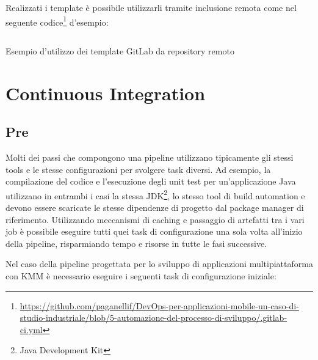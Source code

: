 Realizzati i template è possibile utilizzarli tramite inclusione remota come nel seguente codice\footnote{\href{https://github.com/paganellif/DevOps-per-applicazioni-mobile-un-caso-di-studio-industriale/blob/5-automazione-del-processo-di-sviluppo/.gitlab-ci.yml}{https://github.com/paganellif/DevOps-per-applicazioni-mobile-un-caso-di-studio-industriale/blob/5-automazione-del-processo-di-sviluppo/.gitlab-ci.yml}} d'esempio:

\begin{listing}[H]
    \inputminted{yaml}{code/template-usage.yaml}
    \caption{Esempio d'utilizzo dei template GitLab da repository remoto}
\end{listing}

\section{Continuous Integration}
\subsection{Pre}
Molti dei passi che compongono una pipeline utilizzano tipicamente gli stessi tools e le stesse configurazioni per svolgere task diversi. 
Ad esempio,
la compilazione del codice e l'esecuzione degli unit test per un'applicazione Java utilizzano in entrambi i casi la stessa JDK\footnote{Java Development Kit}, 
lo stesso tool di build automation e devono essere scaricate le stesse dipendenze di progetto dal package manager di riferimento.
Utilizzando meccanismi di caching e passaggio di artefatti tra i vari job è possibile eseguire tutti quei task di configurazione una sola volta all'inizio della pipeline,
risparmiando tempo e risorse in tutte le fasi successive.

Nel caso della pipeline progettata per lo sviluppo di applicazioni multipiattaforma con KMM è necessario eseguire i seguenti task di configurazione iniziale:

